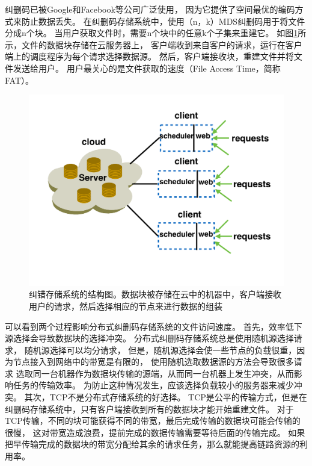 纠删码已被Google和Facebook等公司广泛使用\cite{sathiamoorthy2013xoring,wu2010cloud}，
因为它提供了空间最优的编码方式来防止数据丢失。
在纠删码存储系统中，使用（n，k）MDS纠删码用于将文件分成n个块。
当用户获取文件时，需要n个块中的任意k个子集来重建它。
如图\ref{erasure-distribute-fig}所示，文件的数据块存储在云服务器上，
客户端收到来自客户的请求，运行在客户端上的调度程序为每个请求选择数据源。
然后，客户端接收块，重建文件并将文件发送给用户。
用户最关心的是文件获取的速度（File Access Time，简称FAT）。
\begin{figure}[b]
\begin{center}
\includegraphics [width=0.8\columnwidth] {figures/DTARGET/picture/motivation/distribute.pdf}
\caption{纠错存储系统的结构图。数据块被存储在云中的机器中，客户端接收用户的请求，然后选择相应的节点来进行数据的组装}
\label{erasure-distribute-fig}
\end{center}
\end{figure}

可以看到两个过程影响分布式纠删码存储系统的文件访问速度。
首先，效率低下源选择会导致数据块的选择冲突。
分布式纠删码存储系统总是使用随机源选择请求，
随机源选择可以均分请求，
但是，随机源选择会使一些节点的负载很重，因为节点接入到网络中的带宽是有限的，
使用随机选取数据源的方法会导致很多请求
选取同一台机器作为数据块传输的源端，从而同一台机器上发生冲突，从而影响任务的传输效率。
为防止这种情况发生，应该选择负载较小的服务器来减少冲突。
其次，TCP不是分布式存储系统的好选择。
TCP是公平的传输方式，但是在纠删码存储系统中，只有客户端接收到所有的数据块才能开始重建文件。
对于TCP传输，不同的块可能获得不同的带宽，最后完成传输的数据块可能会传输的很慢，
这对带宽造成浪费，提前完成的数据传输需要等待后面的传输完成。
如果把早传输完成的数据块的带宽分配给其余的请求任务，那么就能提高链路资源的利用率。

